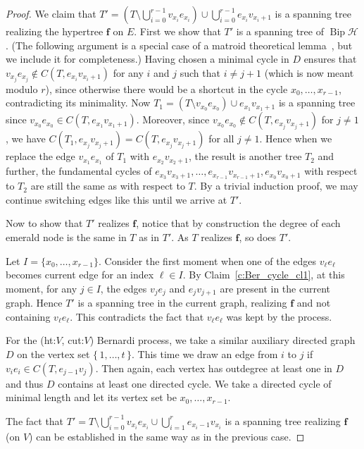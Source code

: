 \documentclass[10pt]{amsart}
\theoremstyle{definition}\newtheorem{defi}[theo]{Definition}
\theoremstyle{remark}\newtheorem{rema}[theo]{Remark}
\newcommand{\HH}{\mathcal H}
\DeclareMathOperator{\bip}{Bip}
\begin{document}
\begin{proof}
We claim that $T'=\left(T\setminus\bigcup_{i=0}^{r-1} v_{x_i}e_{x_i}\right)\cup \bigcup_{i=0}^{r-1}e_{x_i}v_{x_i+1}$ is a spanning tree realizing the hypertree $\mathbf f$ on $E$. First we show that $T'$ is a spanning tree of $\bip \HH$. (The following argument is a special case of a matroid theoretical lemma~\cite[Theorem~39.13]{Schrijver_CombOpt}, but we include it for completeness.) Having chosen a minimal cycle in $D$ ensures that $v_{x_j}e_{x_j}\notin C(T,e_{x_i}v_{x_i+1})$ for any $i$ and $j$ such that $i\neq j+1$ (which is now meant modulo $r$), since otherwise there would be a shortcut in the cycle $x_0,\dots,x_{r-1}$, contradicting its minimality. Now $T_1=(T\setminus v_{x_0}e_{x_0})\cup e_{x_1}v_{x_1+1}$ is a spanning tree since $v_{x_0}e_{x_0}\in C(T,e_{x_1}v_{x_1+1})$. Moreover, since $v_{x_0}e_{x_0}\notin C(T,e_{x_j}v_{x_j+1})$ for $j\neq 1$, we have $C(T_1,e_{x_j}v_{x_j+1})=C(T,e_{x_j}v_{x_j+1})$ for all $j\neq 1$. Hence when we replace the edge $v_{x_1}e_{x_1}$ of $T_1$ with $e_{x_2}v_{x_2+1}$, the result is another tree $T_2$ and further, the fundamental cycles of $e_{x_3}v_{x_3+1},\ldots,e_{x_{r-1}}v_{x_{r-1}+1},e_{x_0}v_{x_0+1}$ with respect to $T_2$ are still the same as with respect to $T$. By a trivial induction proof, we may continue switching edges like this until we arrive at $T'$.

Now to show that $T'$ realizes $\mathbf f$, notice that by construction the degree of each emerald node is the same in $T$ as in $T'$. As $T$ realizes $\mathbf f$, so does $T'$.

Let $I=\{x_0,\dots,x_{r-1}\}$. Consider the first moment when one of the edges $v_\ell e_\ell$ becomes current edge for an index $\ell\in I$. By Claim~\ref{c:Ber_cycle_cl1}, at this moment, for any $j\in I$, the edges $v_j e_j$ and $e_j v_{j+1}$ are present in the current graph. Hence $T'$ is a spanning tree in the current graph, realizing $\mathbf f$ and not containing $v_\ell e_\ell$. This contradicts the fact that $v_\ell e_\ell$ was kept by the process.

For the (ht:$V$, cut:$V$) Bernardi process, we take a similar auxiliary directed graph~$D$ on the vertex set $\{\,1,\dots,t\,\}$. This time we draw an edge from $i$ to $j$ if $v_{i}e_{i}\in C(T,e_{j-1}v_j)$. Then again, each vertex has outdegree at least one in $D$ and thus $D$ contains at least one directed cycle. We take a directed cycle of minimal length and let its vertex set be $x_0,\dots,x_{r-1}$.

The fact that $T'=T\setminus\bigcup_{i=0}^{r-1} v_{x_i}e_{x_i}\cup \bigcup_{i=1}^{r}e_{x_i-1}v_{x_i}$ is a spanning tree realizing $\mathbf f$ (on $V$) can be established in the same way as in the previous case. 


\end{proof}
\end{document}
